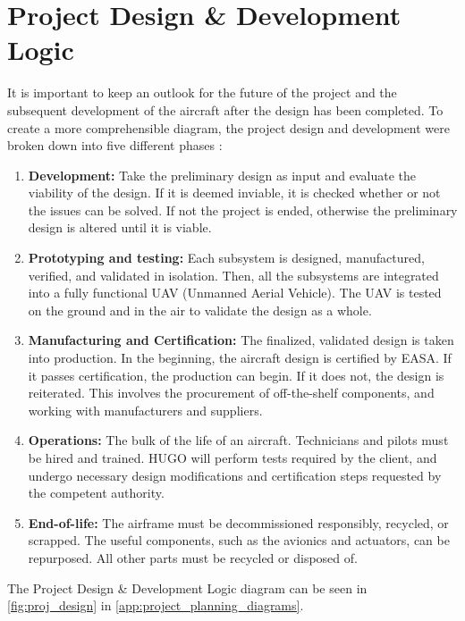 \section{Project Design \& Development Logic }
\label{sec:Project Design Development Logic}
It is important to keep an outlook for the future of the project and the subsequent development of the aircraft after the design has been completed. To create a more comprehensible diagram, the project design and development were broken down into five different phases \cite{Spitz2001}: 

\begin{enumerate}
    \item \textbf{Development: } Take the preliminary design as input and evaluate the viability of the design. If it is deemed inviable, it is checked whether or not the issues can be solved. If not the project is ended, otherwise the preliminary design is altered until it is viable.   
    \item \textbf{Prototyping and testing:} Each subsystem is designed, manufactured, verified, and validated in isolation. Then, all the subsystems are integrated into a fully functional UAV (Unmanned Aerial Vehicle). The UAV is tested on the ground and in the air to validate the design as a whole.
    \item \textbf{Manufacturing and Certification:} The finalized, validated design is taken into production. In the beginning, the aircraft design is certified by EASA. If it passes certification, the production can begin. If it does not, the design is reiterated. This involves the procurement of off-the-shelf components, and working with manufacturers and suppliers. 
    \item \textbf{Operations:} The bulk of the life of an aircraft. Technicians and pilots must be hired and trained. %
    HUGO will perform tests required by the client, and undergo necessary design modifications and certification steps requested by the competent authority.
    \item \textbf{End-of-life:} The airframe must be decommissioned responsibly, recycled, or scrapped. The useful components, such as the avionics and actuators, can be repurposed. All other parts must be recycled or disposed of.%
\end{enumerate}
The Project Design \& Development Logic diagram can be seen in \autoref{fig:proj_design} in \autoref{app:project_planning_diagrams}.

